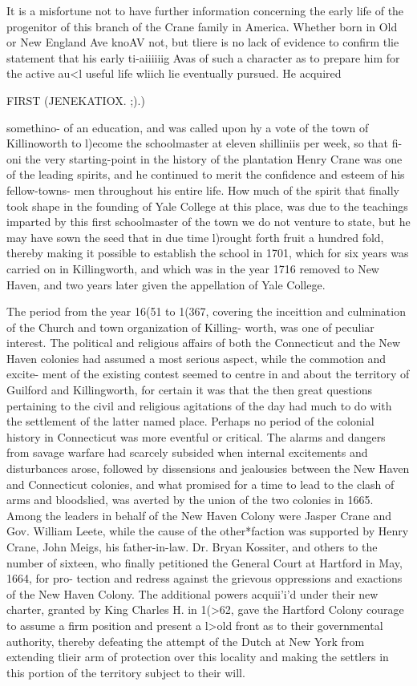 \documentclass{book}
\begin{document}
It is a misfortune not to have further information concerning 
the early life of the progenitor of this branch of the Crane family 
in America. Whether born in Old or New England Ave knoAV not, 
but tliere is no lack of evidence to confirm tlie statement that his 
early ti-aiiiiiig Avas of such a character as to prepare him for the 
active au<l useful life wliich lie eventually pursued. He acquired 



FIRST (JENEKATIOX. ;).) 

somethino- of an education, and was called upon hy a vote of the 
town of Killinoworth to l)ecome the schoolmaster at eleven shilliniis 
per week, so that fi-oni the very starting-point in the history of 
the plantation Henry Crane was one of the leading spirits, and he 
continued to merit the confidence and esteem of his fellow-towns- 
men throughout his entire life. How much of the spirit that 
finally took shape in the founding of Yale College at this place, 
was due to the teachings imparted by this first schoolmaster of 
the town we do not venture to state, but he may have sown the 
seed that in due time l)rought forth fruit a hundred fold, thereby 
making it possible to establish the school in 1701, which for six 
years was carried on in Killingworth, and which was in the year 
1716 removed to New Haven, and two years later given the 
appellation of Yale College. 

The period from the year 16(51 to 1(367, covering the inceittion 
and culmination of the Church and town organization of Killing- 
worth, was one of peculiar interest. The political and religious 
affairs of both the Connecticut and the New Haven colonies had 
assumed a most serious aspect, while the commotion and excite- 
ment of the existing contest seemed to centre in and about the 
territory of Guilford and Killingworth, for certain it was that the 
then great questions pertaining to the civil and religious agitations 
of the day had much to do with the settlement of the latter named 
place. Perhaps no period of the colonial history in Connecticut 
was more eventful or critical. The alarms and dangers from 
savage warfare had scarcely subsided when internal excitements 
and disturbances arose, followed by dissensions and jealousies 
between the New Haven and Connecticut colonies, and what 
promised for a time to lead to the clash of arms and bloodslied, 
was averted by the union of the two colonies in 1665. Among 
the leaders in behalf of the New Haven Colony were Jasper Crane 
and Gov. William Leete, while the cause of the other*faction was 
supported by Henry Crane, John Meigs, his father-in-law. Dr. 
Bryan Kossiter, and others to the number of sixteen, who finally 
petitioned the General Court at Hartford in May, 1664, for pro- 
tection and redress against the grievous oppressions and exactions 
of the New Haven Colony. The additional powers acquii'i'd 
under their new charter, granted by King Charles H. in 1(>62, 
gave the Hartford Colony courage to assume a firm position and 
present a l>old front as to their governmental authority, thereby 
defeating the attempt of the Dutch at New York from extending 
tlieir arm of protection over this locality and making the settlers 
in this portion of the territory subject to their will. 
\end{document}

